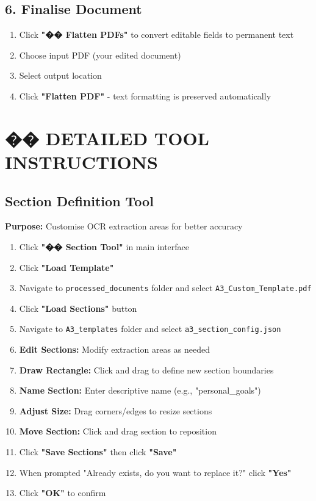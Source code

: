 \documentclass[11pt,a4paper]{article}
\begin{document}
\subsection*{6. \faFile\space Finalise Document}
\begin{enumerate}[leftmargin=*,itemsep=0pt]
    \item Click \textcolor{primary}{\textbf{"�� Flatten PDFs"}} to convert editable fields to permanent text
    \item Choose input PDF (your edited document)
    \item Select output location
    \item Click \textcolor{success}{\textbf{"Flatten PDF"}} - text formatting is preserved automatically
\end{enumerate}

\section*{��️ DETAILED TOOL INSTRUCTIONS}

\subsection*{\faBook\space Section Definition Tool}
\textbf{Purpose:} Customise OCR extraction areas for better accuracy
\begin{enumerate}[leftmargin=*,itemsep=0pt]
    \item Click \textcolor{primary}{\textbf{"�� Section Tool"}} in main interface
    \item Click \textcolor{primary}{\textbf{"Load Template"}}
    \item Navigate to \texttt{processed\_documents} folder and select \texttt{A3\_Custom\_Template.pdf}
    \item Click \textcolor{primary}{\textbf{"Load Sections"}} button
    \item Navigate to \texttt{A3\_templates} folder and select \texttt{a3\_section\_config.json}
    \item \textbf{Edit Sections:} Modify extraction areas as needed
    \item \textbf{Draw Rectangle:} Click and drag to define new section boundaries
    \item \textbf{Name Section:} Enter descriptive name (e.g., "personal\_goals")
    \item \textbf{Adjust Size:} Drag corners/edges to resize sections
    \item \textbf{Move Section:} Click and drag section to reposition
    \item Click \textcolor{success}{\textbf{"Save Sections"}} then click \textcolor{success}{\textbf{"Save"}}
    \item When prompted "Already exists, do you want to replace it?" click \textcolor{success}{\textbf{"Yes"}}
    \item Click \textcolor{success}{\textbf{"OK"}} to confirm
\end{enumerate}
\end{document}
